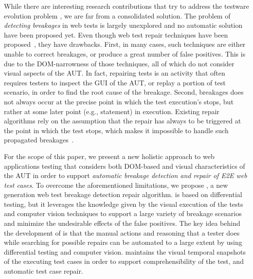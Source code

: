 While there are interesting research contributions that try to address the testware evolution problem \cite{2016-leotta-Advances,2014-leotta-WoSAR,2015-leotta-ICST,Thummalapenta:2013:ECT:2486788.2486926,Yandrapally:2014:RTA:2610384.2610390,Choudhary:2011:WWA:2002931.2002935,Hammoudi-2016-FSE}, we are far from a consolidated solution. 
The problem of \textit{detecting breakages} in web tests is largely unexplored and no automatic solution have been proposed yet. Even though web test repair techniques have been proposed~\cite{Choudhary:2011:WWA:2002931.2002935,Hammoudi:2016:WIA:2950290.2950294,2015-leotta-ICST}, they have drawbacks. 
First, in many cases, such techniques are either unable to correct breakages, or produce a great number of false positives. 
This is due to the DOM-narrowness of those techniques, all of which do not consider visual aspects of the AUT. In fact, repairing tests is an activity that often requires testers to inspect the GUI of the AUT, or replay a portion of test scenario, in order to find the root cause of the breakage.
Second, breakages does not always occur at the precise point in which the test execution's stops, but rather at some later point (e.g., statement) in execution. Existing repair algorithms rely on the assumption that the repair has always to be triggered at the point in which the test stops, which makes it impossible to handle such propagated breakages~\cite{Hammoudi-2016-ICST}.


For the scope of this paper, we present a new holistic approach to  web applications testing that considers both DOM-based and visual characteristics of the AUT in order to support \textit{automatic breakage detection and repair of E2E web test cases}. 
To overcome the aforementioned limitations, we propose \tool, a new generation web test breakage detection repair algorithm. \tool is based on differential testing, but it leverages the knowledge given by the visual execution of the tests and computer vision techniques to support a large variety of breakage scenarios and minimize the undesirable effects of the false positives. The key idea behind the development of \tool is that the manual actions and reasoning that a tester does while searching for possible repairs can be automated to a large extent by using differential testing and computer vision. 
\tool maintains the visual temporal snapshots of the executing test cases in order to support comprehensibility of the test, and automatic test case repair.


